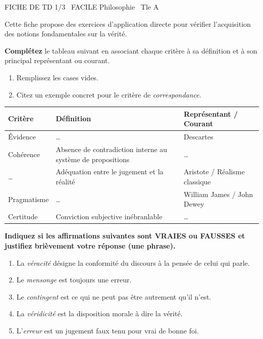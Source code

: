 \documentclass[11pt]{article}
\begin{document}
\begin{tcolorbox}[enhanced,colback=popink,colframe=popink,arc=10pt,boxrule=0pt,left=12pt,right=12pt,top=9pt,bottom=9pt]
{\color{white}\popxbold\small FICHE DE TD 1/3 \textbullet\ FACILE \hfill Philosophie \textbullet\ Tle A\par}
\end{tcolorbox}
\vspace{4pt}

Cette fiche propose des exercices d'application directe pour vérifier l'acquisition des notions fondamentales sur la vérité.

\begin{exercice}
\textbf{Complétez} le tableau suivant en associant chaque critère à sa définition et à son principal représentant ou courant.
\begin{enumerate}
    \item Remplissez les cases vides.
    \item Citez un exemple concret pour le critère de \textit{correspondance}.
\end{enumerate}
\begin{tabularx}{\linewidth}{|X|X|X|}
\hline
\textbf{Critère} & \textbf{Définition} & \textbf{Représentant / Courant} \\
\hline
Évidence & \ldots & Descartes \\
\hline
Cohérence & Absence de contradiction interne au système de propositions & \ldots \\
\hline
\ldots & Adéquation entre le jugement et la réalité & Aristote / Réalisme classique \\
\hline
Pragmatisme & \ldots & William James / John Dewey \\
\hline
Certitude & Conviction subjective inébranlable & \ldots \\
\hline
\end{tabularx}
\end{exercice}

\begin{exercice}
\textbf{Indiquez si les affirmations suivantes sont VRAIES ou FAUSSES et justifiez brièvement votre réponse (une phrase).}
\begin{enumerate}
    \item La \textit{véracité} désigne la conformité du discours à la pensée de celui qui parle.
    \item Le \textit{mensonge} est toujours une erreur.
    \item Le \textit{contingent} est ce qui ne peut pas être autrement qu'il n'est.
    \item La \textit{véridicité} est la disposition morale à dire la vérité.
    \item L'\textit{erreur} est un jugement faux tenu pour vrai de bonne foi.
\end{enumerate}
\end{exercice}
\end{document}
